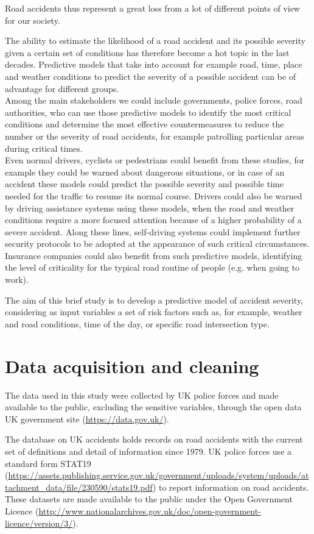 \documentclass[11pt]{article}
\begin{document}
Road accidents thus represent a great loss from a lot of different points of view for our society.

The ability to estimate the likelihood of a road accident and its possible severity given a certain set of conditions has therefore become a hot topic in the last decades. Predictive models that take into account for example road, time, place and weather conditions to predict the severity of a possible accident can be of advantage for different groups.\\
Among the main stakeholders we could include governments, police forces, road authorities, who can use those predictive models to identify the most critical conditions and determine the most effective countermeasures to reduce the number or the severity of road accidents, for example patrolling particular areas during critical times.\\
Even normal drivers, cyclists or pedestrians could benefit from these studies, for example they could be warned about dangerous situations, or in case of an accident these models could predict the possible severity and possible time needed for the traffic to resume its normal course. Drivers could also be warned by driving assistance systems using these models, when the road and weather conditions require a more focused attention because of a higher probability of a severe accident. Along these lines, self-driving systems could implement further security protocols to be adopted at the appearance of such critical circumstances.
Insurance companies could also benefit from such predictive models, identifying the level of criticality for the typical road routine of people (e.g. when going to work).

The aim of this brief study is to develop a predictive model of accident severity, considering as input variables a set of risk factors such as, for example, weather and road conditions, time of the day, or specific road intersection type.

    \hypertarget{data-source}{%
\section{Data acquisition and cleaning}\label{data-source}}

The data used in this study were collected by UK police forces and made available to the public, excluding the sensitive variables, through the open data UK government site (\url{https://data.gov.uk/}).

The database on UK accidents holds records on road accidents with the current set of definitions and detail of information since 1979. UK police forces use a standard form STAT19 (\url{https://assets.publishing.service.gov.uk/government/uploads/system/uploads/attachment_data/file/230590/stats19.pdf}) to report information on road accidents.\\ 
These datasets are made available to the public under the Open Government Licence (\url{http://www.nationalarchives.gov.uk/doc/open-government-licence/version/3/}).
\end{document}
